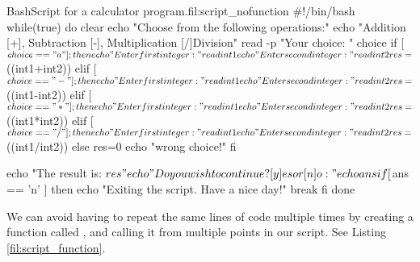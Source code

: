 \begin{source_code_float}{Bash}{Script for a calculator program.}{fil:script_nofunction}
#!/bin/bash
while(true)
do
    clear
    echo "Choose from the following operations:"
    echo "Addition [+], Subtraction [-], Multiplication [/]Division"
    read -p "Your choice: " choice
    if [ $choice == "a" ] ; then
        echo "Enter first integer: " 
        read int1
        echo "Enter second integer: "
        read int2
        res=$((int1+int2))
     elif [ $choice == "-" ] ; then
        echo "Enter first integer: "
        read int1
        echo "Enter second integer: " 
        read int2
        res=$((int1-int2))
     elif [ $choice == "*" ] ; then
        echo "Enter first integer: " 
        read int1
        echo "Enter second integer: " 
        read int2
        res=$((int1*int2))
    elif [ $choice == "/" ] ; then
        echo "Enter first integer: " 
        read int1
        echo "Enter second integer: " 
        read int2
        res=$((int1/int2))
    else
        res=0
        echo "wrong choice!"
    fi

    echo "The result is:  $res"
    echo "Do you wish to continue? [y]es or [n]o: "
    echo  ans
    if [ $ans == 'n' ]
        then
         echo "Exiting the script. Have a nice day!"
        break
    fi
done
\end{source_code_float}

We can avoid having to repeat the same lines of code multiple times by creating a function called , and calling it from multiple points in our script. See Listing \ref{fil:script_function}.

